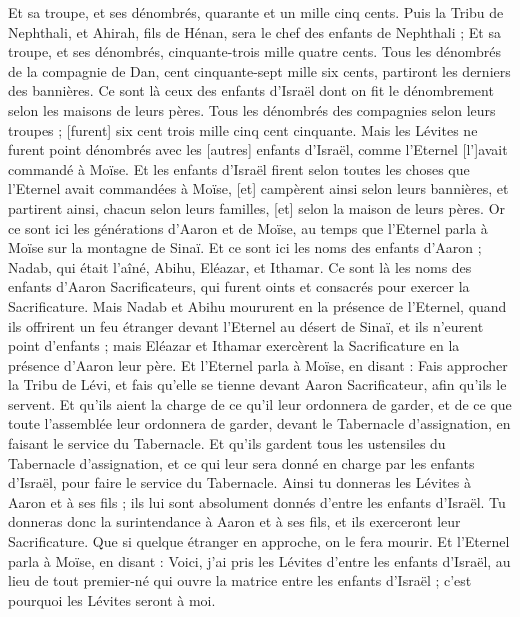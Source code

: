 \begin{multicols}{2}
Et sa troupe, et ses dénombrés, quarante et un mille cinq cents.
Puis la Tribu de Nephthali, et Ahirah, fils de Hénan, sera le chef des enfants de Nephthali ;
Et sa troupe, et ses dénombrés, cinquante-trois mille quatre cents.
Tous les dénombrés de la compagnie de Dan, cent cinquante-sept mille six cents, partiront les derniers des bannières.
Ce sont là ceux des enfants d'Israël dont on fit le dénombrement selon les maisons de leurs pères. Tous les dénombrés des compagnies selon leurs troupes ; [furent] six cent trois mille cinq cent cinquante.
Mais les Lévites ne furent point dénombrés avec les [autres] enfants d'Israël, comme l'Eternel [l']avait commandé à Moïse.
Et les enfants d'Israël firent selon toutes les choses que l'Eternel avait commandées à Moïse, [et] campèrent ainsi selon leurs bannières, et partirent ainsi, chacun selon leurs familles, [et] selon la maison de leurs pères.
\VerseOne{}Or ce sont ici les générations d'Aaron et de Moïse, au temps que l'Eternel parla à Moïse sur la montagne de Sinaï.
Et ce sont ici les noms des enfants d'Aaron ; Nadab, qui était l'aîné, Abihu, Eléazar, et Ithamar.
Ce sont là les noms des enfants d'Aaron Sacrificateurs, qui furent oints et consacrés pour exercer la Sacrificature.
Mais Nadab et Abihu moururent en la présence de l'Eternel, quand ils offrirent un feu étranger devant l'Eternel au désert de Sinaï, et ils n'eurent point d'enfants ; mais Eléazar et Ithamar exercèrent la Sacrificature en la présence d'Aaron leur père.
Et l'Eternel parla à Moïse, en disant :
Fais approcher la Tribu de Lévi, et fais qu'elle se tienne devant Aaron Sacrificateur, afin qu'ils le servent.
Et qu'ils aient la charge de ce qu'il leur ordonnera de garder, et de ce que toute l'assemblée leur ordonnera de garder, devant le Tabernacle d'assignation, en faisant le service du Tabernacle.
Et qu'ils gardent tous les ustensiles du Tabernacle d'assignation, et ce qui leur sera donné en charge par les enfants d'Israël, pour faire le service du Tabernacle.
Ainsi tu donneras les Lévites à Aaron et à ses fils ; ils lui sont absolument donnés d'entre les enfants d'Israël.
Tu donneras donc la surintendance à Aaron et à ses fils, et ils exerceront leur Sacrificature. Que si quelque étranger en approche, on le fera mourir.
Et l'Eternel parla à Moïse, en disant :
Voici, j'ai pris les Lévites d'entre les enfants d'Israël, au lieu de tout premier-né qui ouvre la matrice entre les enfants d'Israël ; c'est pourquoi les Lévites seront à moi.

\end{multicols}
